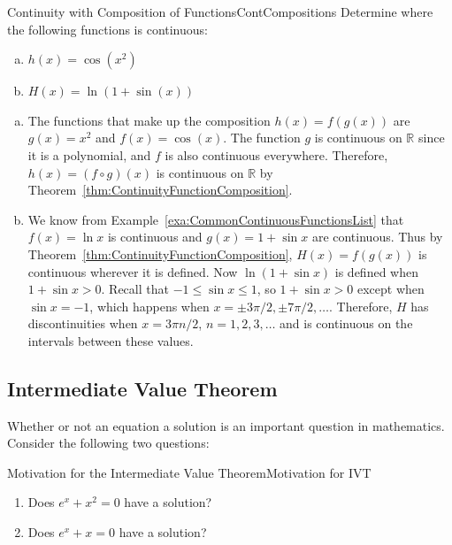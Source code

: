 \begin{example}{Continuity with Composition of Functions}{ContCompositions}
Determine where the following functions is continuous:
\begin{enumerate}[(a)]
	\item	$h(x)=\cos(x^2)$
	\item	$H(x)=\ln(1+\sin(x))$
\end{enumerate}
\end{example}
\begin{solution}
\begin{enumerate}[(a)]
	\item	The functions that make up the composition $h(x)=f(g(x))$
	are $g(x)=x^2$ and $f(x)=\cos(x)$.
	The function $g$ is continuous on $\mathbb{R}$ since it is a polynomial,
	and $f$ is also continuous everywhere. Therefore, $h(x)=(f\circ g)(x)$
	is continuous on $\mathbb{R}$ by Theorem~\ref{thm:ContinuityFunctionComposition}.
	\item	We know from Example~\ref{exa:CommonContinuousFunctionsList}
	that $f(x)=\ln x$ is continuous and $g(x)=1+\sin x$ are continuous. Thus by
	Theorem~\ref{thm:ContinuityFunctionComposition}, $H(x)=f(g(x))$ is continuous
	wherever it is defined. Now $\ln(1+\sin x)$ is defined when $1+\sin x>0$.
	Recall that $-1\leq \sin x\leq 1$, so $1+\sin x>0$ except when $\sin x=-1$,
	which happens when $x=\pm 3\pi/2,\pm 7\pi/2,\ldots$. Therefore, $H$ has discontinuities
	when $x=3\pi n/2$, $n=1,2,3,\ldots$ and is continuous on the intervals between these values.
\end{enumerate}
\end{solution}


\subsection*{Intermediate Value Theorem}
Whether or not an equation  a solution is an important question in mathematics.
Consider the following two questions:

\begin{example}{Motivation for the Intermediate Value Theorem}{Motivation for IVT}\label{MotivationforIVT}
\vspace{-0.5cm}
\begin{enumerate}
	\item Does $e^x+x^2=0$ have a solution?
	\item Does $e^x+x=0$ have a solution?
\end{enumerate}
\end{example}

